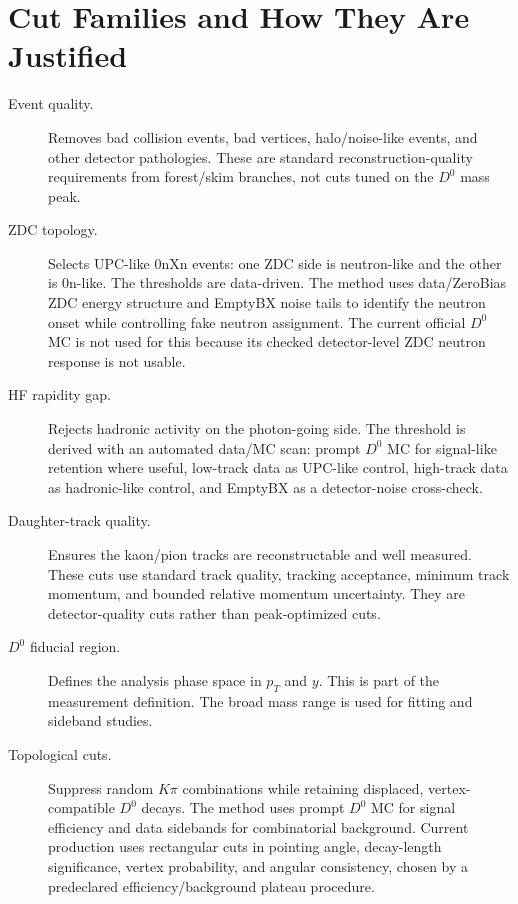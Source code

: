 \documentclass[10pt]{article}
\begin{document}
\section*{Cut Families and How They Are Justified}

\begin{description}
\item[Event quality.]
Removes bad collision events, bad vertices, halo/noise-like events, and other
detector pathologies. These are standard reconstruction-quality requirements
from forest/skim branches, not cuts tuned on the \(D^0\) mass peak.

\item[ZDC topology.]
Selects UPC-like 0nXn events: one ZDC side is neutron-like and the other is
0n-like. The thresholds are data-driven. The method uses data/ZeroBias ZDC
energy structure and EmptyBX noise tails to identify the neutron onset while
controlling fake neutron assignment. The current official \(D^0\) MC is not
used for this because its checked detector-level ZDC neutron response is not
usable.

\item[HF rapidity gap.]
Rejects hadronic activity on the photon-going side. The threshold is derived
with an automated data/MC scan: prompt \(D^0\) MC for signal-like retention
where useful, low-track data as UPC-like control, high-track data as
hadronic-like control, and EmptyBX as a detector-noise cross-check.

\item[Daughter-track quality.]
Ensures the kaon/pion tracks are reconstructable and well measured. These cuts
use standard track quality, tracking acceptance, minimum track momentum, and
bounded relative momentum uncertainty. They are detector-quality cuts rather
than peak-optimized cuts.

\item[\(D^0\) fiducial region.]
Defines the analysis phase space in \(p_T\) and \(y\). This is part of the
measurement definition. The broad mass range is used for fitting and sideband
studies.

\item[Topological cuts.]
Suppress random \(K\pi\) combinations while retaining displaced,
vertex-compatible \(D^0\) decays. The method uses prompt \(D^0\) MC for signal
efficiency and data sidebands for combinatorial background. Current production
uses rectangular cuts in pointing angle, decay-length significance, vertex
probability, and angular consistency, chosen by a predeclared
efficiency/background plateau procedure.
\end{description}
\end{document}
